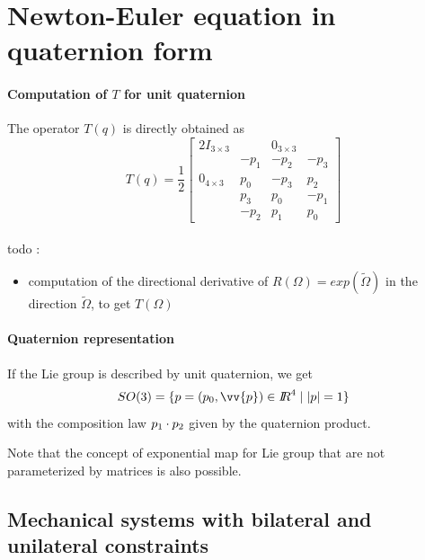 \section{Newton-Euler equation in quaternion  form}

\paragraph{Computation of $T$ for unit quaternion} The operator $T(q)$ is directly obtained as
\begin{equation}
  T(q)=\frac 1 2 \label{eq:98}
  \begin{bmatrix}
    2 I_{3\times 3} & & 0_{3\times 3} & \\
    &   -p_1 & -p_2 & -p_3 \\
    0_{4\times 3}  &  p_0 & -p_3 & p_2 \\
    & p_3 & p_0 & -p_1 \\
    & -p_2 & p_1 & p_0
  \end{bmatrix}
\end{equation}

\paragraph{}




\begin{ndrva}
  todo :
  \begin{itemize}
  \item computation of the directional derivative of $R(\Omega)= exp(\tilde \Omega)$ in the direction $\tilde\Omega$, to get $T(\Omega)$
  \end{itemize}
\end{ndrva}

\paragraph{Quaternion representation}If the Lie group is described by unit quaternion, we get
\begin{equation}
  \label{eq:99}
  SO(3) = \{p = (p_0,\vv{p}) \in \RR^{4}\mid |p|=1  \}
\end{equation}
with the composition law  $p_1\cdot p_2$ given by the quaternion product.



Note that the concept of exponential map for Lie group that are not parameterized by matrices is also possible.


\subsection{Mechanical systems  with bilateral and unilateral constraints}
\label{section22}


